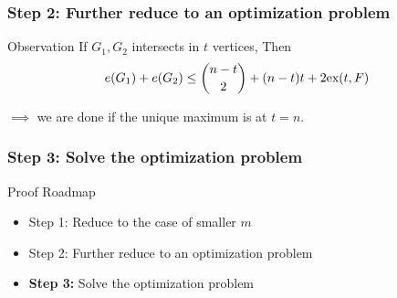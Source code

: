 \documentclass{beamer}
\newcommand*{\ex}{\textnormal{ex}}
\begin{document}
\begin{frame}
  \frametitle{Step 2: Further reduce to an optimization problem}

  \begin{center}
  \end{center}

  \pause

  \begin{block}{Observation}
    If $G_1, G_2$ intersects in $t$ vertices, Then
    \[
      e(G_1) + e(G_2) \leq \binom{n - t}{2} + (n - t)t + 2\ex(t, F)
    \]
  \end{block}

  \pause

  \vspace{0.3cm}

  $\implies$ we are done if the unique maximum is at $t = n$.
\end{frame}

\begin{frame}
  \frametitle{Step 3: Solve the optimization problem}

  Proof Roadmap

  \begin{itemize}
    \item Step 1: Reduce to the case of smaller $m$
    \item Step 2: Further reduce to an optimization problem
    \item \textbf{Step 3:} Solve the optimization problem
  \end{itemize}
\end{frame}

\end{document}
